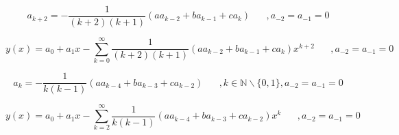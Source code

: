\begin{refsection}
\begin{equation}
	a_{k+2} = -\frac{1}{(k+2)(k+1)} (aa_{k-2}+ba_{k-1}+ca_k)
	\hspace{20pt}, a_{-2} = a_{-1} = 0
	\label{wellen:koeffizientengleichung}
\end{equation}

\begin{equation}
	y(x) = a_0 + a_1x 
	-\sum_{k=0}^{\infty}\frac{1}{(k+2)(k+1)}(aa_{k-2}+ba_{k-1}+ca_k)x^{k+2}
	\hspace{20pt}, a_{-2} = a_{-1} = 0
	\label{wellen:ygleichung}
\end{equation}

\begin{equation}
	a_{k} = -\frac{1}{k(k-1)} (aa_{k-4}+ba_{k-3}+ca_{k-2})
	\hspace{20pt}, k \in \mathbb{N} \backslash \{0, 1\}, a_{-2} = a_{-1} = 0
	\label{wellen:koeffizientengleichungak}
\end{equation}

\begin{equation}
y(x) = a_0 + a_1x 
-\sum_{k=2}^{\infty}\frac{1}{k(k-1)}(aa_{k-4}+ba_{k-3}+ca_{k-2})x^k
\hspace{20pt}, a_{-2} = a_{-1} = 0
\label{wellen:ygleichungak}
\end{equation}

\printbibliography[heading=subbibliography]
\end{refsection}